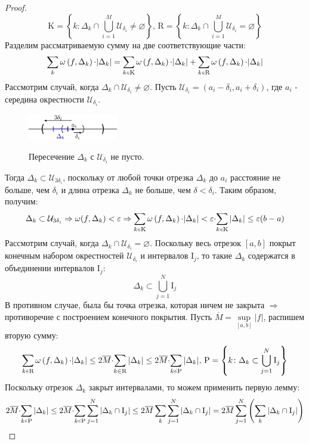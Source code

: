 \documentclass[12pt]{article}
\newcommand{\MI}{\mathrm{I}}
\newcommand{\MU}{\mathcal{U}}
\newcommand{\VN}{\varnothing}
\newcommand{\VE}{\varepsilon}
\theoremstyle{definition}
\newcommand{\smallerrel}[1]{\mathrel{\mathpalette\smallerrelaux{#1}}}
\newcommand{\smallerrelaux}[2]{\raisebox{.1ex}{\scalebox{.75}{$#1#2$}}}
\newcommand{\smallin}{\smallerrel{\in}}
\begin{document}
\begin{proof}
	$$
		\mathrm{K} = \left\{k \colon \Delta_k \cap \bigcup\limits_{i=1}^{M} \MU_{\delta_i} \neq \VN \right\}, \, \mathrm{R} = \left\{k \colon \Delta_k \cap \bigcup\limits_{i=1}^{M} \MU_{\delta_i} = \VN \right\}
	$$
	Разделим рассматриваемую сумму на две соответствующие части:
	$$
		\sum\limits_{k}\omega\left(f, \Delta_k\right){\cdot}|\Delta_k| = \sum\limits_{k \smallin \mathrm{K}}\omega\left(f, \Delta_k\right){\cdot}|\Delta_k| + \sum\limits_{k \smallin \mathrm{R}}\omega\left(f, \Delta_k\right){\cdot}|\Delta_k|
	$$
	Рассмотрим случай, когда $\Delta_k \cap \MU_{\delta_i} \neq \VN$. Пусть $\MU_{\delta_i} = (a_i - \delta_i, a_i + \delta_i)$, где $a_i$ - середина окрестности $\MU_{\delta_i}$.
	\begin{figure}[H]
		\centering
		\includegraphics[width=0.35\textwidth]{25_2.eps}
		\label{25_2}
		\caption{Пересечение $\Delta_k$ с $\MU_{\delta_i}$ не пусто.}
		\label{fig:Случай пересечения точек 1}
	\end{figure}
	Тогда $\Delta_k \subset \MU_{3\delta_i}$, поскольку от любой точки отрезка $\Delta_k$ до $a_i$ расстояние не больше, чем $\delta_i$ и длина отрезка $\Delta_k$ не больше, чем $\delta < \delta_i$. Таким образом, получим:
	$$
		\Delta_k \subset \MU_{3\delta_i} \Rightarrow \omega(f,\Delta_k) < \VE \Rightarrow \sum\limits_{k \smallin \mathrm{K}}\omega\left(f, \Delta_k\right){\cdot}|\Delta_k| < \VE{\cdot}\!\sum\limits_{k \smallin \mathrm{K}}|\Delta_k|\leq \VE(b-a)
	$$
	Рассмотрим случай, когда $\Delta_k \cap \MU_{\delta_i} = \VN$. Поскольку весь отрезок $[a,b]$ покрыт конечным набором окрестностей $\MU_{\delta_i}$ и интервалов $\MI_j$, то такие $\Delta_k$ содержатся в объединении интервалов $\MI_j$:
	$$
		\Delta_k \subset \bigcup\limits_{j = 1}^N \MI_j 
	$$
	В противном случае, была бы точка отрезка, которая ничем не закрыта $\Rightarrow$ противоречие с построением конечного покрытия. Пусть $\overline{M} = \sup\limits_{[a,b]}|f|$, распишем вторую сумму:
	$$
		\sum\limits_{k \smallin \mathrm{R}}\omega\left(f, \Delta_k\right){\cdot}|\Delta_k| \leq 2\overline{M} {\cdot}\! \sum\limits_{k \in \mathrm{R}}|\Delta_k| \leq 2\overline{M} {\cdot}\! \sum\limits_{k \smallin \mathrm{P}}|\Delta_k|, \, \mathrm{P} = \left\{k \colon \Delta_k \subset\bigcup\limits_{j = 1}^N \MI_j  \right\}
	$$
	Поскольку отрезок $\Delta_k$ закрыт интервалами, то можем применить первую лемму:
	$$
		2\overline{M} {\cdot}\! \sum\limits_{k \smallin \mathrm{P}}|\Delta_k| \leq 2\overline{M} {\cdot}\! \sum\limits_{k \smallin \mathrm{P}} \sum\limits_{j = 1}^N|\Delta_k \cap \MI_j| \leq 2 \overline{M} \sum\limits_{k}\sum\limits_{j = 1}^N |\Delta_k \cap \MI_j| = 2 \overline{M} \sum\limits_{j = 1}^N\left(\sum\limits_{k} |\Delta_k \cap \MI_j|\right)
$$
\end{proof}
\end{document}
